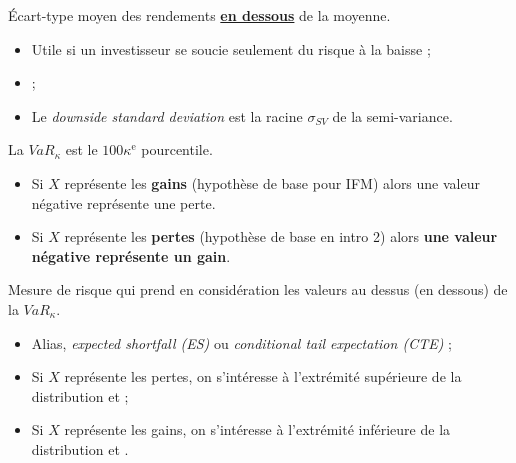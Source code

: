 \documentclass[10pt, french]{article}
\begin{document}
\begin{multicols*}{2}
\begin{definitionNOHFILL}
Écart-type moyen des rendements \underline{\textbf{en dessous}} de la moyenne.

\begin{itemize}
		\item	Utile si un investisseur se soucie seulement du risque à la baisse ;
		\item	{} ;
		\item	Le \og \textit{downside standard deviation} \fg{} est la racine $\sigma_{SV}$ de la semi-variance.
		\end{itemize}
\end{definitionNOHFILL}

\begin{definitionNOHFILL}
La $VaR_{\kappa}$ est le $100\kappa^{\text{e}}$ pourcentile.

\begin{itemize}
	\item	Si $X$ représente les \textbf{gains} (hypothèse de base pour IFM) alors une valeur négative représente une perte.
	\item	Si $X$ représente les \textbf{pertes} (hypothèse de base en intro 2) alors \textbf{une valeur négative représente un gain}.
\end{itemize}
\end{definitionNOHFILL}

\begin{definitionNOHFILL}
Mesure de risque qui prend en considération les valeurs au dessus (en dessous) de la $VaR_{\kappa}$.

\begin{itemize}[leftmargin = *]
	\item	Alias, \og \textit{expected shortfall (ES)} \fg{} ou \og \textit{conditional tail expectation (CTE)} \fg{} ;
	\item	Si $X$ représente les pertes, on s'intéresse à l'extrémité supérieure de la distribution et  ;
	\item	Si $X$ représente les gains, on s'intéresse à l'extrémité inférieure de la distribution et .
\end{itemize}
\end{definitionNOHFILL}



\end{multicols*}
\end{document}
